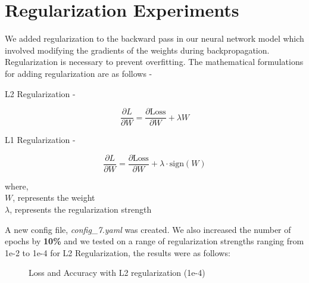 \documentclass{article}
\begin{document}
\vspace{2cm}

\section{Regularization Experiments}

We added regularization to the backward pass in our neural network model which involved modifying the gradients of the weights during backpropagation. Regularization is necessary to prevent overfitting. The mathematical formulations for adding regularization are as follows - 

L2 Regularization -

\[
\frac{\partial L}{\partial W} = \frac{\partial \text{Loss}}{\partial W} + \lambda W
\]

L1 Regularization -

\[
\frac{\partial L}{\partial W} = \frac{\partial \text{Loss}}{\partial W} + \lambda \cdot \text{sign}(W)
\]

where,\\
$W$, represents the weight\\
$\lambda$, represents the regularization strength

A new config file, \textit{config\_7.yaml} was created. We also increased the number of epochs by \textbf{10\%} and we tested on a range of regularization strengths ranging from 1e-2 to 1e-4 for L2 Regularization, the results were as follows:


\begin{figure}[h!]
    \centering
    \hfill
    \caption{Loss and Accuracy with L2 regularization (1e-4)}
    \label{fig:loss_acc_l2}
\end{figure}
\end{document}
